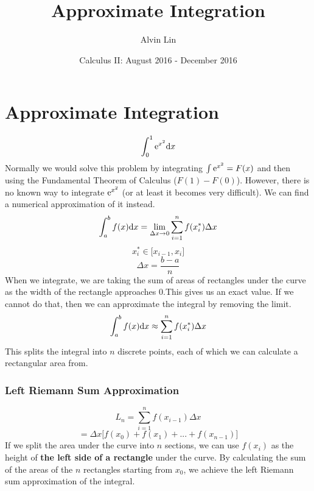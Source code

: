 \documentclass{math}
\title{Approximate Integration}
\author{Alvin Lin}
\date{Calculus II: August 2016 - December 2016}
\begin{document}
\maketitle

\section*{Approximate Integration}
\[ \int_{0}^{1}{\mathrm{e}^{x^{2}}\mathrm{d}{x}} \]
Normally we would solve this problem by integrating
\( \int{\mathrm{e}^{x^{2}}} = F(x) \) and
then using the Fundamental Theorem of Calculus (\( F(1)-F(0) \)). However, there
is no known way to integrate \( \mathrm{e}^{x^{2}} \) (or at least it becomes very
difficult). We can find a numerical approximation of it instead.
\[ \int_{a}^{b}{f(x)\mathrm{d}{x}} = \lim_{\Delta x \to 0}
   \sum_{i=1}^{n}{f(x_{i}^{*})\Delta x} \]
\[ x_{i}^{*}\in\bigg[x_{i-1},x_{i}\bigg] \]
\[ \Delta x = \frac{b-a}{n} \]
When we integrate, we are taking the sum of areas of rectangles under the curve
as the width of the rectangle approaches 0.This gives us an exact value. If we
cannot do that, then we can approximate the integral by removing the limit.
\[ \int_{a}^{b}{f(x)\mathrm{d}{x}} \approx \sum_{i=1}^{n}{f(x_{i}^{*})\Delta x} \]
This splits the integral into \( n \) discrete points, each of which we can
calculate a rectangular area from.

\subsubsection*{Left Riemann Sum Approximation}
\[ L_{n} = \sum_{i=1}^{n}{f(x_{i-1})\Delta x} \]
\[ = \Delta x\bigg[f(x_{0})+f(x_{1})+...+f(x_{n-1})\bigg] \]
If we split the area under the curve into \(n\) sections, we can use
\( f(x_{i}) \) as the height of \textbf{the left side of a rectangle} under the
curve. By calculating the sum of the areas of the \(n\) rectangles starting from
\( x_{0} \), we achieve the left Riemann sum approximation of the integral.
\begin{center}
\end{center}
\end{document}
